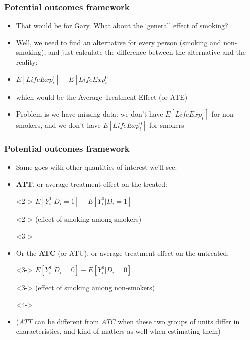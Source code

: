 \documentclass[aspectratio=43]{beamer}
\begin{document}
\begin{frame}
\frametitle{Potential outcomes framework}
\centering

\begin{itemize}
  \item<1-> That would be for Gary. What about the `general' effect of smoking?
  \item<2-> Well, we need to find an alternative for every person (smoking and non-smoking), and just calculate the difference between the alternative and the reality:
  \item<2->[] $E[LifeExp_{i}^{1}] - E[LifeExp_{i}^{0}]$
  \item<2->[] which would be the Average Treatment Effect (or ATE)
  \item<3-> Problem is we have missing data: we don't have $E[LifeExp_{i}^{1}]$ for non-smokers, and we don't have $E[LifeExp_{i}^{0}]$ for smokers
\end{itemize}

\end{frame}

\begin{frame}
\frametitle{Potential outcomes framework}
\centering

\begin{itemize}
  \item<1-> Same goes with other quantities of interest we'll see:
  \item<2-> \textbf{ATT}, or average treatment effect on the treated:
  \item[]<2-> $E[Y_{i}^{1}|D_{i} = 1] - E[Y_{i}^{0}|D_{i} = 1]$
  \item[]<2-> {\small (effect of smoking among smokers)}
  \item[]<3->
  \item<3-> Or the \textbf{ATC} (or ATU), or average treatment effect on the untreated:
  \item[]<3-> $E[Y_{i}^{1}|D_{i} = 0] - E[Y_{i}^{0}|D_{i} = 0]$
  \item[]<3-> {\small (effect of smoking among non-smokers)}
  \item[]<4->
  \item<4-> ($ATT$ can be different from $ATC$ when these two groups of units differ in characteristics, and kind of matters as well when estimating them)
\end{itemize}

\end{frame}
\end{document}

